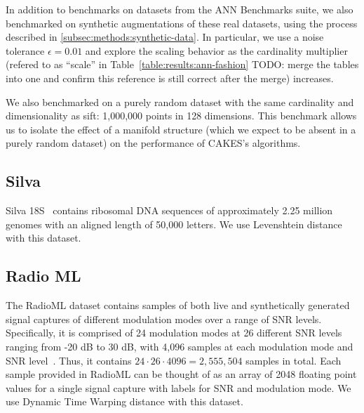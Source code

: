 In addition to benchmarks on datasets from the ANN Benchmarks suite, we also benchmarked on synthetic augmentations of these real datasets, using the process described in \ref{subsec:methods:synthetic-data}. 
In particular, we use a noise tolerance $\epsilon = 0.01$ and explore the scaling behavior as the cardinality multiplier (refered to as ``scale'' in Table~\ref{table:results:ann-fashion} {\color{red} TODO: merge the tables into one and confirm this reference is still correct after the merge}) increases. 

We also benchmarked on a purely random dataset with the same cardinality and dimensionality as sift: 1,000,000 points in 128 dimensions. 
This benchmark allows us to isolate the effect of a manifold structure (which we expect to be absent in a purely random dataset) on the performance of CAKES's algorithms. 

\subsection{Silva}
\label{subsec:silva}
Silva 18S~\cite{10.1093/nar/gks1219} contains ribosomal DNA sequences of approximately 2.25 million genomes with an aligned length of 50,000 letters.
We use Levenshtein distance with this dataset.


\subsection{Radio ML}
The RadioML dataset contains samples of both live and synthetically generated signal captures of different modulation modes over a range of SNR levels. 
Specifically, it is comprised of 24 modulation modes at 26 different SNR levels ranging from -20 dB to 30 dB, with 4,096 samples at each modulation mode and SNR level~\cite{oshea2018radioml}. 
Thus, it contains $24 \cdot 26 \cdot 4096 = 2,555,504$ samples in total. 
Each sample provided in RadioML can be thought of as an array of 2048 floating point values for a single signal capture with labels for SNR and modulation mode.
We use Dynamic Time Warping distance with this dataset. 

\label{subsec:radioml}